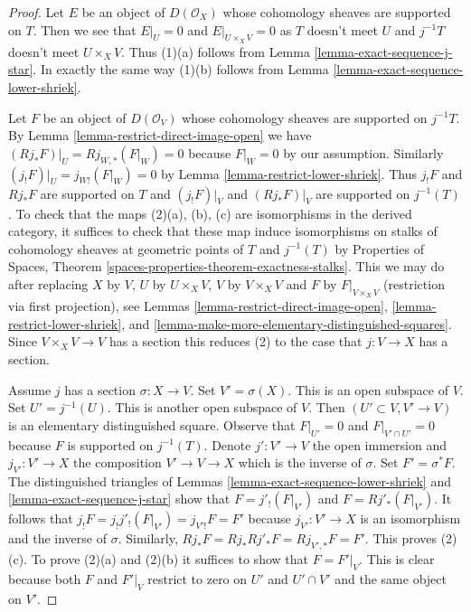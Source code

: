 \begin{proof}
Let $E$ be an object of $D(\mathcal{O}_X)$ whose cohomology sheaves are
supported on $T$. Then we see that $E|_U = 0$ and $E|_{U \times_X V} = 0$
as $T$ doesn't meet $U$ and $j^{-1}T$ doesn't meet $U \times_X V$.
Thus (1)(a) follows from Lemma \ref{lemma-exact-sequence-j-star}.
In exactly the same way (1)(b) follows from
Lemma \ref{lemma-exact-sequence-lower-shriek}.

\medskip\noindent
Let $F$ be an object of $D(\mathcal{O}_V)$ whose cohomology sheaves
are supported on $j^{-1}T$. By
Lemma \ref{lemma-restrict-direct-image-open} we have
$(Rj_*F)|_U = Rj_{W, *}(F|_W) = 0$ because $F|_W = 0$ by our assumption.
Similarly $(j_!F)|_U = j_{W!}(F|_W) = 0$ by
Lemma \ref{lemma-restrict-lower-shriek}.
Thus $j_!F$ and $Rj_*F$ are
supported on $T$ and $(j_!F)|_V$ and $(Rj_*F)|_V$ are supported on
$j^{-1}(T)$. To check that the maps (2)(a), (b), (c) are isomorphisms
in the derived category, it suffices to check that these map induce
isomorphisms on stalks of cohomology sheaves at geometric points of $T$
and $j^{-1}(T)$ by
Properties of Spaces, Theorem
\ref{spaces-properties-theorem-exactness-stalks}.
This we may do after replacing $X$ by $V$, $U$ by $U \times_X V$,
$V$ by $V \times_X V$ and $F$ by $F|_{V \times_X V}$ (restriction via
first projection), see
Lemmas \ref{lemma-restrict-direct-image-open},
\ref{lemma-restrict-lower-shriek}, and
\ref{lemma-make-more-elementary-distinguished-squares}.
Since $V \times_X V \to V$ has a section this
reduces (2) to the case that $j : V \to X$ has a section.

\medskip\noindent
Assume $j$ has a section $\sigma : X \to V$.
Set $V' = \sigma(X)$. This is an open subspace of $V$.
Set $U' = j^{-1}(U)$. This is another open subspace of $V$.
Then $(U' \subset V, V' \to V)$ is an elementary distinguished
square. Observe that $F|_{U'} = 0$ and $F|_{V' \cap U'} = 0$
because $F$ is supported on $j^{-1}(T)$. Denote $j' : V' \to V$
the open immersion and $j_{V'} : V' \to X$ the composition
$V' \to V \to X$ which is the inverse of $\sigma$.
Set $F' = \sigma^*F$. The distinguished triangles of
Lemmas \ref{lemma-exact-sequence-lower-shriek} and
\ref{lemma-exact-sequence-j-star} show that
$F = j'_!(F|_{V'})$ and $F = Rj'_*(F|_{V'})$.
It follows that $j_!F = j_!j'_!(F|_{V'}) = j_{V'!}F = F'$
because $j_{V'} : V' \to X$ is an isomorphism and the inverse
of $\sigma$. Similarly, $Rj_*F = Rj_*Rj'_*F = Rj_{V', *}F = F'$.
This proves (2)(c). To prove (2)(a) and (2)(b) it suffices
to show that $F = F'|_V$. This is clear because both $F$ and $F'|_V$
restrict to zero on $U'$ and $U' \cap V'$ and the same object
on $V'$.
\end{proof}

